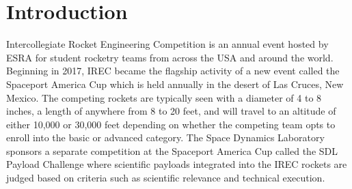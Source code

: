 \documentclass[conference]{IEEEtran} %
\begin{document}
\label{sec:nomenclature}
\newcommand{\nomunit}[1]{%
\renewcommand{\nomentryend}{\hspace*{\fill}#1}}
\renewcommand{\nompreamble}{

  }
\printnomenclature{}



\section{Introduction}
\label{sec:Introduction}

 Intercollegiate Rocket Engineering Competition is an annual event hosted by ESRA for student rocketry teams from across the USA and around the world.
Beginning in 2017, IREC became the flagship activity of a new event called the Spaceport America Cup which is held annually in the desert of Las Cruces, New Mexico.
The competing rockets are typically seen with a diameter of 4 to 8 inches, a length of anywhere from 8 to 20 feet, and will travel to an altitude of either 10,000 or 30,000
feet depending on whether the competing team opts to enroll into the basic or advanced category. The Space Dynamics Laboratory sponsors a separate competition at the
Spaceport America Cup called the SDL Payload Challenge where scientific payloads integrated into the IREC rockets are judged based on criteria such as scientific relevance and technical execution.
\end{document}
